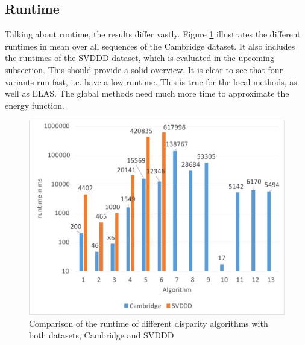 \subsection{Runtime}

Talking about runtime, the results differ vastly.
Figure \ref{fig:eval-plots-runtime} illustrates the different runtimes in mean over all sequences of the Cambridge dataset.
It also includes the runtimes of the SVDDD dataset, which is evaluated in the upcoming subsection.
This should provide a solid overview.
It is clear to see that four variants run fast, i.e. have a low runtime.
This is true for the local methods, as well as ELAS.
The global methods need much more time to approximate the energy function.

\begin{figure}[h!]
\centering
\includegraphics[width=1.0\textwidth]{src/images/evaluation/plots/runtime.pdf}
\caption[Comparison of the runtime of different disparity algorithms]{Comparison of the runtime of different disparity algorithms with both datasets, Cambridge and SVDDD}
\label{fig:eval-plots-runtime}
\end{figure}

